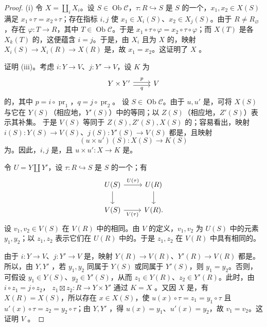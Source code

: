 \begin{proof}
(i) 令 $X=\coprod_iX_i$。设 $S\in\operatorname{Ob}\mathcal C$，$\tau:R\hookrightarrow S$ 是 $S$ 的一个，$x_1,x_2\in X(S)$ 满足 $x_1\circ\tau=x_2\circ\tau$；存在指标 $i,j$ 使 $x_1\in X_i(S)$、$x_2\in X_j(S)$。由于 $R\ne R_{\varnothing}$，存在 $\varphi:T\to R$，其中 $T\in\operatorname{Ob}\mathcal C$。于是 $x_1\circ\tau\circ\varphi=x_2\circ\tau\circ\varphi$；而 $X(T)$ 是各 $X_k(T)$ 的，这便蕴含 $i=j$。于是，由 $X_i$ 且为 $X$ 的，映射 $X_i(S)\to X_i(R)\to X(R)$ 是，故 $x_1=x_2$。这证明了 $X$ 。

证明 (iii)。考虑 $i:Y\to V$、$j:Y'\to V$，设 $K$ 为
\[
\begin{tikzcd}Y\times Y'\arrow[r,shift left=.5ex,"p"]\arrow[r,shift right=.5ex,"q"']&V\end{tikzcd}
\]
的，其中 $p=i\circ\operatorname{pr}_1$，$q=j\circ\operatorname{pr}_2$。
设 $S\in\operatorname{Ob}\mathcal C$。由于 $u,u'$ 是，可将 $X(S)$ 与它在 $Y(S)$（相应地，$Y'(S)$）中的等同；以 $Z(S)$（相应地，$Z'(S)$）表示其补集。
于是 $V(S)$ 等同于 $Z(S),Z'(S),X(S)$ 的；容易看出，映射 $i(S):Y(S)\to V(S)$、$j(S):Y'(S)\to V(S)$ 都是，且映射
\[
(u\times u')(S):X(S)\longrightarrow K(S)
\]
为。因此，$i,j$ 是，且 $u\times u':X\to K$ 是。

令 $U=Y\amalg Y'$，设 $\tau:R\hookrightarrow S$ 是 $S$ 的一个；有
\[
\begin{tikzcd}
U(S)\arrow[r,"U(\tau)"]\arrow[d]&U(R)\arrow[d]\\
V(S)\arrow[r,"V(\tau)"']&V(R).
\end{tikzcd}
\]
设 $v_1,v_2\in V(S)$ 在 $V(R)$ 中的相同。由 $V$ 的定义，$v_1,v_2$ 为 $U(S)$ 中的元素 $y_1,y_2$；以 $z_1,z_2$ 表示它们在 $U(R)$ 中的。于是 $z_1,z_2$ 在 $V(R)$ 中具有相同的。

由于 $i:Y\to V$、$j:Y'\to V$ 是，映射 $Y(R)\to V(R)$、$Y'(R)\to V(R)$ 都是。所以，由 $Y,Y'$ ，若 $y_1,y_2$ 同属于 $Y(S)$ 或同属于 $Y'(S)$，则 $y_1=y_2$。否则，可假设 $y_1\in Y(S)$、$y_2\in Y'(S)$，从而 $z_1\in Y(R)$、$z_2\in Y'(R)$。此时，由 $i\circ z_1=j\circ z_2$， $z_1\mathbin{\boxtimes}z_2:R\to Y\times Y'$ 通过 $K=X$ 。又因 $X$ 是，有 $X(R)=X(S)$，所以存在 $x\in X(S)$，使 $u(x)\circ\tau=z_1=y_1\circ\tau$ 且 $u'(x)\circ\tau=z_2=y_2\circ\tau$；由 $Y,Y'$ ，得 $u(x)=y_1$、$u'(x)=y_2$，故 $v_1=v_2$。这证明 $V$ 。


\end{proof}
